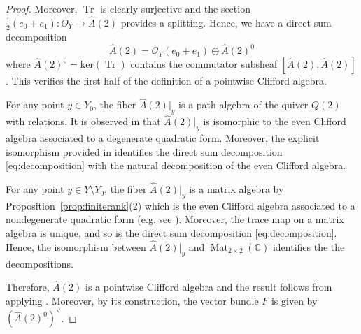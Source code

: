 \documentclass[11pt]{amsart}
\theoremstyle{plain}
\theoremstyle{definition}
\theoremstyle{remark}
\def\C{\mathbb{C}}
\def\O{\mathcal{O}}
\def\ker{\textrm{ker}}
\def\wA{\widehat{A}}
\begin{document}
\begin{proof}
        Moreover, $\operatorname{Tr}$ is clearly surjective and the section $\frac{1}{2}(e_0+e_1): O_Y\to \wA(2)$ provides a splitting. Hence, we have a direct sum decomposition
        \begin{equation}\label{eq:decomposition}
            \wA(2) = \O_Y(e_0+e_1)\oplus \wA(2)^0
        \end{equation}
        where $\wA(2)^0= \ker (\operatorname{Tr})$ contains the commutator subsheaf $[\wA(2), \wA(2)]$. This verifies the first half of the definition of a pointwise Clifford algebra. 

        For any point $y\in Y_0$, the fiber $\wA(2)|_y$ is a path algebra of the quiver $Q(2)$ with relations. It is observed in \cite[Proposition 4.1]{lee-clifford} that $\wA(2)|_y$ is isomorphic to the even Clifford algebra associated to a degenerate quadratic form. Moreover, the explicit isomorphism provided in \cite[Eq. (19)]{lee-clifford} identifies the direct sum decomposition \ref{eq:decomposition} with the natural decomposition of the even Clifford algebra. 

        For any point $y\in Y\setminus Y_0$, the fiber $\wA(2)|_y$ is a matrix algebra by Proposition~\ref{prop:finiterank}(2) which is the even Clifford algebra associated to a nondegenerate quadratic form (e.g. see \cite[Remark 2.4]{kuznetsov2025spinormodificationsconicbundles}). Moreover, the trace map on a matrix algebra is unique, and so is the direct sum decomposition \ref{eq:decomposition}. Hence, the isomorphism between $\wA(2)|_y$ and $\operatorname{Mat}_{2\times 2}(\C)$ identifies the the decompositions. 

        Therefore, $\wA(2)$ is a pointwise Clifford algebra and the result follows from applying \cite[Proposition 2.7]{kuznetsov2025spinormodificationsconicbundles}. 
        Moreover, by its construction, the vector bundle $F$ is given by $(\wA(2)^0)^{\vee}$. 
    \end{proof}
\end{document}
